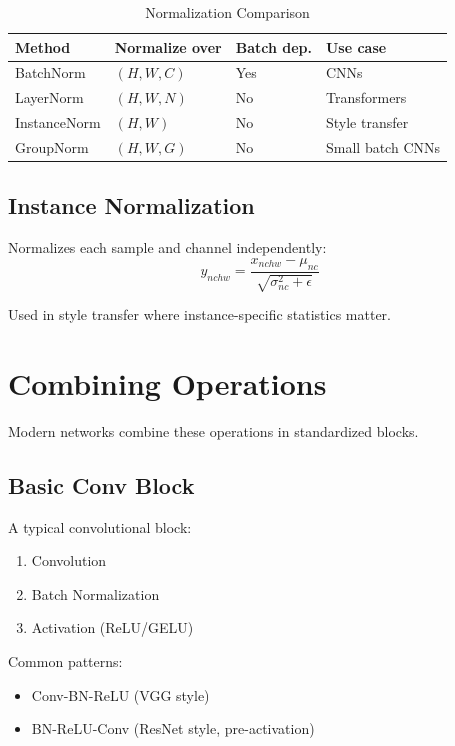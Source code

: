 \begin{table}[h]
    \centering
    \caption{Normalization Comparison}
    \begin{tabular}{L{2cm} L{2.5cm} L{2.5cm} L{3cm}}
        \toprule
        \textbf{Method} & \textbf{Normalize over} & \textbf{Batch dep.} & \textbf{Use case} \\
        \midrule
        BatchNorm & $(H, W, C)$ & Yes & CNNs \\
        LayerNorm & $(H, W, N)$ & No & Transformers \\
        InstanceNorm & $(H, W)$ & No & Style transfer \\
        GroupNorm & $(H, W, G)$ & No & Small batch CNNs \\
        \bottomrule
    \end{tabular}
\end{table}

\subsection{Instance Normalization}

Normalizes each sample and channel independently:
\begin{equation}
y_{nchw} = \frac{x_{nchw} - \mu_{nc}}{\sqrt{\sigma_{nc}^2 + \epsilon}}
\end{equation}

Used in style transfer where instance-specific statistics matter.

\section{Combining Operations}

Modern networks combine these operations in standardized blocks.

\subsection{Basic Conv Block}

A typical convolutional block:
\begin{enumerate}
    \item Convolution
    \item Batch Normalization
    \item Activation (ReLU/GELU)
\end{enumerate}

Common patterns:
\begin{itemize}
    \item Conv-BN-ReLU (VGG style)
    \item BN-ReLU-Conv (ResNet style, pre-activation)
\end{itemize}


